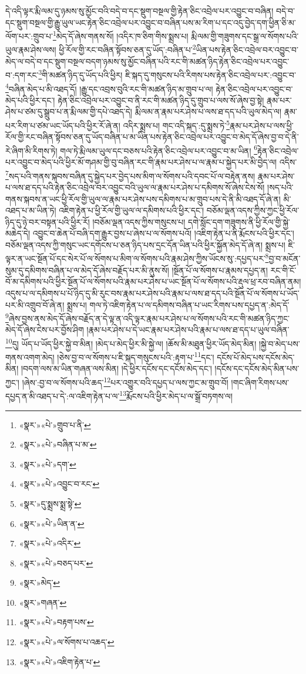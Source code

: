 དེ་འདི་ལྟར་རྨི་ལམ་དུ་ཉམས་སུ་མྱོང་བའི་བདེ་བ་དང་སྡུག་བསྔལ་གྱི་རྟེན་ཅིང་འབྲེལ་པར་འབྱུང་བ་བཞིན། བདེ་བ་དང་སྡུག་བསྔལ་གྱི་རྒྱུ་ཡུལ་ཡང་རྟེན་ཅིང་འབྲེལ་པར་འབྱུང་བ་བཞིན་པས་མ་རིག་པ་དང་འདུ་བྱེད་དག་ཕྱིན་ཅི་མ་ལོག་པར་:གྲུབ་པ་\footnote{«སྣར་»«པེ་»གྲུབ་པ་ནི་}མེད་དོ་ཞེས་གནས་སོ། །འདིར་ཁ་ཅིག་གིས་སྨྲས་པ། རྨི་ལམ་གྱི་གཟུགས་དང་སྒྲ་ལ་སོགས་པའི་ཡུལ་རྣམ་ཤེས་ལས། ཕྱི་རོལ་གྱི་རང་བཞིན་སྟོབས་ཅན་དུ་ཡོད་:བཞིན་པ་\footnote{«སྣར་»«པེ་»བཞིན་པ་མ་}ཡིན་པས་རྟེན་ཅིང་འབྲེལ་བར་འབྱུང་བ་མེད་ལ་བདེ་བ་དང་སྡུག་བསྔལ་བདག་ཉམས་སུ་མྱོང་བཞིན་པའི་རང་གི་མཚན་ཉིད་རྟེན་ཅིང་འབྲེལ་པར་འབྱུང་བ་:དག་རང་\footnote{«སྣར་»«པེ་»དག་}གི་མཚན་ཉིད་དུ་ཡོད་པའི་ཕྱིར། ཇི་སྐད་དུ་གསུངས་པའི་རིགས་པས་རྟེན་ཅིང་འབྲེལ་པར་:འབྱུང་བ་\footnote{«སྣར་»«པེ་»འབྱུང་བ་རང་}བཞིན་མེད་པ་མི་འཐད་དོ། །རྒྱུ་དང་འབྲས་བུའི་རང་གི་མཚན་ཉིད་མ་གྲུབ་པ་ལ། རྟེན་ཅིང་འབྲེལ་པར་འབྱུང་བ་མེད་པའི་ཕྱིར་དང་། རྟེན་ཅིང་འབྲེལ་པར་འབྱུང་བ་ནི་རང་གི་མཚན་ཉིད་དུ་གྲུབ་པ་ལས་སོ་ཞེས་བྱ་སྟེ། རྣམ་པར་ཤེས་པ་ཙམ་དུ་སྒྲུབ་པ་ན་རྨི་ལམ་གྱི་དཔེ་འཐད་དེ། རྨི་ལམ་ན་རྣམ་པར་ཤེས་པ་ལས་ཐ་དད་པའི་ཡུལ་མེད་ལ། རྣམ་པར་རིག་པ་ཙམ་ཡང་ཡོད་པའི་ཕྱིར་རོ་ཞེ་ན། འདིར་སྨྲས་པ། གང་འདི་སྐད་:དུ་སྨྲས་ཏེ་\footnote{«སྣར་»དུ་སྨྲས་སྨྲ་སྟེ་}རྣམ་པར་ཤེས་པ་ལས་ཕྱི་རོལ་གྱི་རང་བཞིན་སྟོབས་ཅན་དུ་ཡོད་བཞིན་པ་མ་ཡིན་པས་རྟེན་ཅིང་འབྲེལ་པར་འབྱུང་བ་མེད་དོ་ཞེས་བྱ་བ་དེ་ནི་རེ་ཞིག་མི་རིགས་ཏེ། གལ་ཏེ་རྨི་ལམ་ཡུལ་དང་བཅས་པའི་རྟེན་ཅིང་འབྲེལ་པར་འབྱུང་བ་མ་ཡིན། \footnote{«སྣར་»«པེ་»ཡིན་ན་}རྟེན་ཅིང་འབྲེལ་པར་འབྱུང་བ་མེད་པའི་ཕྱིར་མོ་གཤམ་གྱི་བུ་བཞིན་རང་གི་རྣམ་པར་ཤེས་པ་ལ་རྣམ་པ་སྐྱེད་པར་མི་བྱེད་ལ། འདིས་\footnote{«སྣར་»«པེ་»འདིར་}སད་པའི་གནས་སྐབས་བཞིན་དུ་སྐྱེད་པར་བྱེད་པས་མིག་ལ་སོགས་པའི་དབང་པོ་ལ་བརྟེན་ནས། རྣམ་པར་ཤེས་པ་ལས་ཐ་དད་པའི་རྟེན་ཅིང་འབྲེལ་བར་འབྱུང་བའི་ཡུལ་ལ་རྣམ་པར་ཤེས་པ་དམིགས་སོ་ཞེས་ངེས་སོ། །སད་པའི་གནས་སྐབས་ན་ཡང་ཕྱི་རོལ་གྱི་ཡུལ་ལ་རྣམ་པར་ཤེས་པས་དམིགས་པ་མ་གྲུབ་པས་དེ་ནི་མི་འཐད་དོ་ཞེ་ན། མི་འཐད་པ་མ་ཡིན་ཏེ། འཇིག་རྟེན་པ་ཕྱི་རོལ་གྱི་ཡུལ་ལ་དམིགས་པའི་ཕྱིར་དང་། བཅོམ་ལྡན་འདས་ཀྱིས་ཀྱང་ཕྱི་རོལ་ཉིད་དུ་ཉེ་བར་བསྟན་པའི་ཕྱིར་རོ། །བཅོམ་ལྡན་འདས་ཀྱིས་གསུངས་པ། དགེ་སློང་དག་གཟུགས་ནི་ཕྱི་རོལ་གྱི་སྐྱེ་མཆེད་དེ། འབྱུང་བ་ཆེན་པོ་བཞི་དག་རྒྱུར་བྱས་པ་ཞེས་པ་ལ་སོགས་པའོ། །འཇིག་རྟེན་པ་ནི་རྨོངས་པའི་ཕྱིར་དང་། བཅོམ་ལྡན་འདས་ཀྱི་གསུང་ཡང་དགོངས་པ་ཅན་ཉིད་པས་དྲང་དོན་ཡིན་པའི་ཕྱིར་སྐྱོན་མེད་དོ་ཞེ་ན། སྨྲས་པ། ཇི་ལྟར་ན་ཡང་སྔོན་པོ་དང་སེར་པོ་ལ་སོགས་པ་མིག་ལ་སོགས་པའི་རྣམ་ཤེས་ཀྱིས་ཡོངས་སུ་:དཔྱད་པར་\footnote{«སྣར་»«པེ་»བཅད་པར་}བྱ་བ་མངོན་སུམ་དུ་དམིགས་བཞིན་པ་ལ་མེད་དོ་ཞེས་བརྗོད་པར་མི་ནུས་སོ། །སྔོན་པོ་ལ་སོགས་པ་རྣམས་དཔྱད་ན། རང་གི་ངོ་བོ་མ་དམིགས་པའི་ཕྱིར་སྔོན་པོ་ལ་སོགས་པའི་རྣམ་པར་ཤེས་པ་ཡང་སྔོན་པོ་ལ་སོགས་པའི་རྡུལ་ཕྲ་རབ་བཞིན་ནམ། འདུས་པ་ལ་དམིགས་པ་པོ་ཉིད་དུ་མི་རུང་བས་རྣམ་པར་ཤེས་པའི་རྣམ་པ་ལས་ཐ་དད་པའི་སྔོན་པོ་ལ་སོགས་པ་ཡོད་པར་མི་འགྲུབ་བོ་ཞེ་ན། སྨྲས་པ། གལ་ཏེ་འཇིག་རྟེན་པ་ལ་དམིགས་བཞིན་པ་ཡང་རིགས་པས་དཔྱད་ན་:མེད་དོ་\footnote{«སྣར་»མེད་}ཞེས་བྱས་ནས་མེད་དོ་ཞེས་བརྗོད་ན་དེ་ལྟ་ན་འདི་ལྟར་རྣམ་པར་ཤེས་པ་ལ་སོགས་པའི་རང་གི་མཚན་ཉིད་ཀྱང་མེད་དོ་ཞེས་ངེས་པར་བྱོས་ཤིག །རྣམ་པར་ཤེས་པ་དེ་ཡང་རྣམ་པར་ཤེས་པའི་རྣམ་པ་ལས་ཐ་དད་པ་ཡུལ་བཞིན་\footnote{«སྣར་»གཞན་}དུ། ཡོད་པ་ཡོད་ཕྱིར་སྐྱེ་བ་མིན། །མེད་པ་མེད་ཕྱིར་མི་སྐྱེ་ལ། །ཆོས་མི་མཐུན་ཕྱིར་ཡོད་མེད་མིན། །སྐྱེ་བ་མེད་པས་གནས་འགག་མེད། །ཅེས་བྱ་བ་ལ་སོགས་པ་ཇི་སྐད་གསུངས་པའི་:རྟག་པ་\footnote{«སྣར་»«པེ་»བརྟག་པས་}དང་། དངོས་པོ་མེད་པས་དངོས་མེད་མིན། །བདག་ལས་མ་ཡིན་གཞན་ལས་མིན། །དེ་ཕྱིར་དངོས་དང་དངོས་མེད་དང་། །དངོས་དང་དངོས་མེད་མིན་པས་ཀྱང་། །ཞེས་:བྱ་བ་ལ་སོགས་པའི་ཆད་\footnote{«སྣར་»«པེ་»ལ་སོགས་པ་འཆད་}པར་འགྱུར་བའི་དཔྱད་པ་ལས་ཀྱང་མ་གྲུབ་བོ། །གང་ཞིག་རིགས་པས་དཔྱད་ན་མི་འཐད་པ་དེ་:ལ་འཇིག་རྟེན་པ་ལ་\footnote{«སྣར་»«པེ་»འཇིག་རྟེན་པ་}རྨོངས་པའི་ཕྱིར་མེད་པ་ལ་སྒྲོ་བཏགས་ལ། 